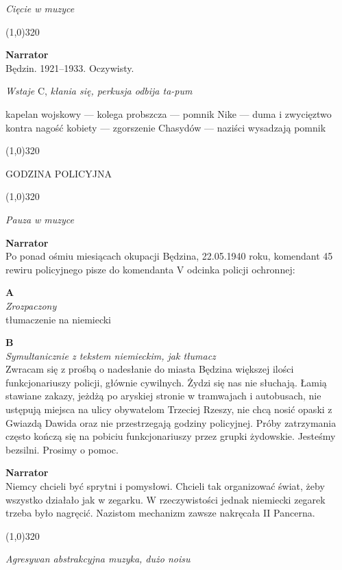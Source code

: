 \documentclass[11pt,a4paper,oneside]{article}
\begin{document}
{\color{light-gray} \emph{Cięcie w muzyce}}


\line(1,0){320}


\textbf{Narrator}\\
Będzin. 1921--1933. Oczywisty. 

{\color{light-gray} \emph{Wstaje} C, \emph{kłania się, perkusja odbija
ta-pum}}

{\color{red} kapelan wojskowy --- kolega probszcza --- pomnik Nike --- duma
i zwycięztwo kontra nagość kobiety --- zgorszenie Chasydów --- naziści
wysadzają pomnik}

\line(1,0){320}

{\color{red}
GODZINA POLICYJNA
}

\line(1,0){320}

{\color{light-gray} \emph{Pauza w muzyce}}

\textbf{Narrator}\\
Po ponad ośmiu miesiącach okupacji Będzina, 22.05.1940 roku, komendant 45
rewiru policyjnego pisze do komendanta V odcinka policji ochronnej:

\textbf{A}\\
{\color{light-gray} \emph{Zrozpaczony}}\\
{\color{red} tłumaczenie na niemiecki}


\textbf{B}\\
{\color{light-gray} \emph{Symultanicznie z tekstem niemieckim, jak tłumacz}}\\
Zwracam się z prośbą o nadesłanie do miasta Będzina większej ilości
funkcjonariuszy policji, głównie cywilnych. Żydzi się nas nie słuchają. Łamią
stawiane zakazy, jeżdżą po aryskiej stronie w tramwajach i autobusach, nie
ustępują miejsca na ulicy obywatelom Trzeciej Rzeszy, nie chcą nosić opaski
z Gwiazdą Dawida oraz nie przestrzegają godziny policyjnej. Próby zatrzymania
często kończą się na pobiciu funkcjonariuszy przez grupki żydowskie. Jesteśmy 
bezsilni. Prosimy o pomoc.


\textbf{Narrator}\\
Niemcy chcieli być sprytni i pomysłowi. Chcieli tak organizować świat, 
żeby wszystko działało jak w zegarku. W rzeczywistości jednak niemiecki 
zegarek trzeba było nagręcić. Nazistom mechanizm zawsze nakręcała
II Pancerna. 

\line(1,0){320}

{\color{light-gray} \emph{Agresywan abstrakcyjna muzyka, dużo noisu}}
\end{document}

